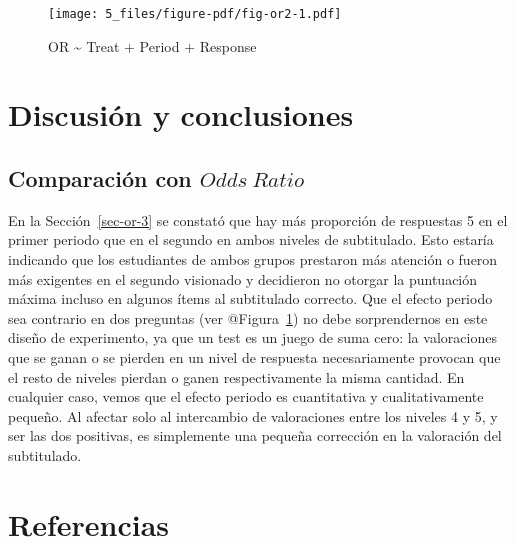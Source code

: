 \documentclass[
  12pt,
  a4paper,
  extrafontsizes,
  onecolumn,
  openright]{memoir}
\begin{document}
\begin{figure}[h]

{\centering \texttt{[image: 5\_files/figure-pdf/fig-or2-1.pdf]}

}

\caption{\label{fig-or2}OR \textasciitilde{} Treat + Period + Response}

\end{figure}


\hypertarget{sec-conclusiones}{%
\chapter{Discusión y conclusiones}\label{sec-conclusiones}}

\hypertarget{sec-or-4}{%
\section{\texorpdfstring{Comparación con
\(Odds\ Ratio\)}{Comparación con Odds\textbackslash{} Ratio}}\label{sec-or-4}}

En la Sección~\ref{sec-or-3} se constató que hay más proporción de
respuestas 5 en el primer periodo que en el segundo en ambos niveles de
subtitulado. Esto estaría indicando que los estudiantes de ambos grupos
prestaron más atención o fueron más exigentes en el segundo visionado y
decidieron no otorgar la puntuación máxima incluso en algunos ítems al
subtitulado correcto. Que el efecto periodo sea contrario en dos
preguntas (ver @Figura~\ref{fig-or2}) no debe sorprendernos en este
diseño de experimento, ya que un test es un juego de suma cero: la
valoraciones que se ganan o se pierden en un nivel de respuesta
necesariamente provocan que el resto de niveles pierdan o ganen
respectivamente la misma cantidad. En cualquier caso, vemos que el
efecto periodo es cuantitativa y cualitativamente pequeño. Al afectar
solo al intercambio de valoraciones entre los niveles 4 y 5, y ser las
dos positivas, es simplemente una pequeña corrección en la valoración
del subtitulado.


\hypertarget{referencias}{%
\chapter*{Referencias}\label{referencias}}

\end{document}
